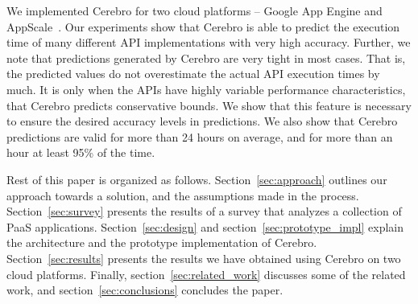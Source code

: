 We implemented Cerebro for two cloud platforms -- Google App Engine and AppScale~\cite{6488671}.
Our experiments show that Cerebro is able to predict the execution time
of many different API implementations with very high accuracy. 
Further, we note that
predictions generated by Cerebro are very tight in most cases. That is, the predicted values do not
overestimate the actual API execution times by much. It is only when the APIs have highly variable 
performance characteristics, that Cerebro predicts conservative bounds. We show that this feature 
is necessary to ensure the desired accuracy levels in predictions.
We also show that Cerebro predictions
are valid for more than 24 hours on average, and for more than an hour at least 95\% of the time.

Rest of this paper is organized as follows. Section~\ref{sec:approach} outlines our approach towards
a solution, and the assumptions made in the process. Section~\ref{sec:survey}
presents the results of a survey that analyzes a collection of PaaS applications. Section~\ref{sec:design}
and section~\ref{sec:prototype_impl} explain the architecture and the prototype implementation of Cerebro.
Section~\ref{sec:results} presents the results we have obtained using Cerebro on two cloud platforms.
Finally, section~\ref{sec:related_work} discusses some of the related work, and section~\ref{sec:conclusions}
concludes the paper.